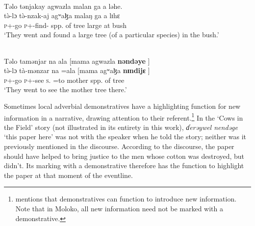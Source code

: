 \ea \label{ex:3:58}\\
Təlo  tənjakay  agwazla  malan  ga  a  ləhe.\\
\gll  t\`{ə}-lɔ            t\`{ə}-nzak-aj           agʷaɮa    malaŋ     ga   a  lɪhɛ\\
      \textsc{p}+{\PFV}-go   \textsc{p}+{\PFV}-find-{\CL}  {spp. of tree}  large    {\ADJ}  at  bush\\
\glt  ‘They went and found a large tree (of a particular species) in the bush.’
\z

\ea \label{ex:3:59}\\
Təlo  tamənjar  na            ala           [mama  agwazla  \textbf{nəndəye} ]\\
\gll  t\`{ə}-lɔ tà-mənzar     na   =ala     [mama  agʷaɮa    \textbf{nɪndijɛ} ]\\
      \textsc{p}+{\PFV}-go    \textsc{p}+{\HOR}-see  \textsc{s}.{\DO}  =to  mother  {spp. of tree}  {\DEM}\\
\glt  ‘They went to see the mother tree there.’
\z

Sometimes local adverbial demonstratives have a highlighting function for new information in a narrative, drawing attention to their referent.\footnote{\citet{Dixon2003} mentions that demonstratives can function to introduce new information. Note that in Moloko, all new information need not be marked with a demonstrative.} In the ‘Cows in the Field’ story (not illustrated in its entirety in this work), \textit{ɗerəywel nendəge} ‘this paper here’  was not with the speaker when he told the story; neither was it previously mentioned in the discourse. According to the discourse, the paper should have helped to bring justice to the men whose cotton was destroyed, but didn’t. Its marking with a demonstrative therefore has the function to highlight the paper at that moment of the eventline. 

